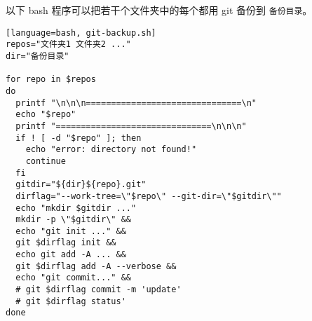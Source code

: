
\begin{issues}
\issueDraft
\end{issues}

以下 bash 程序可以把若干个文件夹中的每个都用 git 备份到 \verb|备份目录|。

\begin{lstlisting}[language=bash, git-backup.sh]
repos="文件夹1 文件夹2 ..."
dir="备份目录"

for repo in $repos
do
  printf "\n\n\n===============================\n"
  echo "$repo"
  printf "===============================\n\n\n"
  if ! [ -d "$repo" ]; then
    echo "error: directory not found!"
    continue
  fi
  gitdir="${dir}${repo}.git"
  dirflag="--work-tree=\"$repo\" --git-dir=\"$gitdir\""
  echo "mkdir $gitdir ..."
  mkdir -p \"$gitdir\" &&
  echo "git init ..." &&
  git $dirflag init &&
  echo git add -A ... &&
  git $dirflag add -A --verbose &&
  echo "git commit..." &&
  # git $dirflag commit -m 'update'
  # git $dirflag status'
done
\end{lstlisting}
